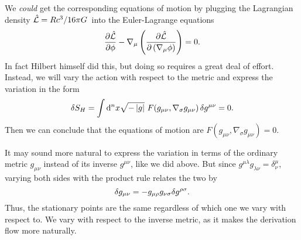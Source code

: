 We \emph{could} get the corresponding equations of motion by plugging the Lagrangian density $\hat{\mathcal{L}} = R c^3 / 16 \pi G$ into the Euler-Lagrange equations
\begin{equation}
	\pdv{\hat{\mathcal{L}}}{\phi} - \nabla_\mu \left( \pdv{\hat{\mathcal{L}}}{{\left(\nabla_\mu \phi\right)}} \right) = 0 .
\end{equation}
In fact Hilbert himself did this, \cite{ref:hilbert_from_lagrange} but doing so requires a great deal of effort.
Instead, we will vary the action with respect to the metric and express the variation in the form 
\begin{equation}
	\variation{S_H} = \int \dif^n x \sqrt{-\det{g}} F(g_{\mu \nu}, \nabla_\sigma g_{\mu \nu}) \, \variation{g^{\mu \nu}} = 0 .
	\label{eq:einstein_derivation:action_form}
\end{equation}
Then we can conclude that the equations of motion are $F(g_{\mu \nu}, \nabla_\sigma g_{\mu \nu}) = 0$.

It may sound more natural to express the variation in terms of the ordinary metric $g_{\mu \nu}$ instead of its inverse $g^{\mu \nu}$, like we did above.
But since $g^{\mu \lambda} g_{\lambda \nu} = \delta^\mu_\nu$, varying both sides with the product rule relates the two by
\begin{equation}
	\delta g_{\mu \nu} = -g_{\mu \rho} g_{\nu \sigma} \delta g^{\rho \sigma} .
	\label{eq:einstein_derivation:var_g_ginv}
\end{equation}
Thus, the stationary points are the same regardless of which one we vary with respect to.
We vary with respect to the inverse metric, as it makes the derivation flow more naturally.

